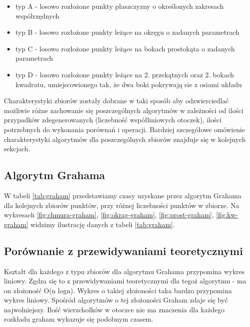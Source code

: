 \documentclass[11pt]{article}
\theoremstyle{remark} \newtheorem{definition}{def.}
\theoremstyle{definition} \newtheorem{twierdzenie}{tw.}
\begin{document}
\begin{itemize}
    \item   typ A - losowo rozłożone punkty płaszczyzny o określonych zakresach współrzędnych
    \item   typ B - losowo rozłożone punkty leżące na okręgu o zadanych parametrach
    \item   typ C - losowo rozłożone punkty leżące na bokach prostokąta o zadanych parametrach
    \item   typ D - losowo rozłożone punkty leżące na 2. przekątnych oraz 2. bokach kwadratu, umiejscowionego tak,
            że dwa boki pokrywają sie z osiami układu \\
\end{itemize}

Charakterystyki zbiorów zostały dobrane w taki sposób aby odzwierciedlać możliwie różne zachowanie się  poszczególnych algorytmów w zależności od ilości przypadków zdegenerowanych (liczebność 
współliniowych otoczek), ilości potrzebnych do wykonania porównań i operacji. Bardziej szczegółowe omówienie charakterystyki algorytmów dla poszczególnych zbiorów znajduje się w kolejnych sekcjach. 



\subsection{Algorytm Grahama}

W tabeli \ref{tab:graham} przedstawiamy czasy uzyskane przez algorytm Grahama dla kolejnych zbiorów punktów, przy różnej liczebności punktów w zbiorze. Na wykresach \ref{fig:chmura-graham}, 
\ref{fig:okrag-graham}, \ref{fig:prost-graham}, \ref{fig:kw-graham} widzimy ilustrację danych z tabeli \ref{tab:graham}.

\subsection {Porównanie z przewidywaniami teoretycznymi} Kształt dla każdego z typu zbiorów dla algorytmu Grahama przypomina wykres liniowy. Zgdza się to z przewidywaniami teoretycznymi
dla tegoż algorytmu - ma on złożoność O(n logn). Wykres o takiej złożoności taka bardzo przypomina wykres liniowy.
Spośród algorytmów o tej złożoności Graham zdaje się być najwolniejszy. Ilość wierzchołków w otoczce nie ma znaczenia
dla każdego rozkładu graham wykazuje się podobnym czasem.
\end{document}
